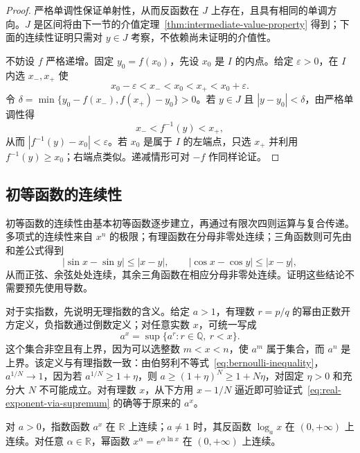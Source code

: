 \begin{proof}
严格单调性保证单射性，从而反函数在 $J$ 上存在，且具有相同的单调方向。$J$ 是区间将由下一节的介值定理~\ref{thm:intermediate-value-property} 得到；下面的连续性证明只需对 $y\in J$ 考察，不依赖尚未证明的介值性。

不妨设 $f$ 严格递增。固定 $y_0=f(x_0)$，先设 $x_0$ 是 $I$ 的内点。给定 $\varepsilon>0$，在 $I$ 内选 $x_-,x_+$ 使
\[
    x_0-\varepsilon<x_-<x_0<x_+<x_0+\varepsilon.
\]
令 $\delta=\min\{y_0-f(x_-),f(x_+)-y_0\}>0$。若 $y\in J$ 且 $|y-y_0|<\delta$，由严格单调性得
\[
    x_-<f^{-1}(y)<x_+,
\]
从而 $|f^{-1}(y)-x_0|<\varepsilon$。若 $x_0$ 是属于 $I$ 的左端点，只选 $x_+$ 并利用 $f^{-1}(y)\geq x_0$；右端点类似。递减情形可对 $-f$ 作同样论证。
\end{proof}

\subsection{初等函数的连续性}
\label{subsec:continuity-of-elementary-functions}

初等函数的连续性由基本初等函数逐步建立，再通过有限次四则运算与复合传递。多项式的连续性来自 $x^n$ 的极限；有理函数在分母非零处连续；三角函数则可先由和差公式得到
\[
    |\sin x-\sin y|\leq|x-y|,
    \qquad |\cos x-\cos y|\leq|x-y|,
\]
从而正弦、余弦处处连续，其余三角函数在相应分母非零处连续。证明这些结论不需要预先使用导数。

对于实指数，先说明无理指数的含义。给定 $a>1$，有理数 $r=p/q$ 的幂由正数开方定义，负指数通过倒数定义；对任意实数 $x$，可统一写成
\begin{equation}
    a^x=\sup\{a^r:r\in\mathbb{Q},\ r<x\}.
    \label{eq:real-exponent-via-supremum}
\end{equation}
这个集合非空且有上界，因为可以选整数 $m<x<n$，使 $a^m$ 属于集合，而 $a^n$ 是上界。该定义与有理指数一致：由伯努利不等式~\eqref{eq:bernoulli-inequality}，$a^{1/N}\to1$，因为若 $a^{1/N}\geq1+\eta$，则 $a\geq(1+\eta)^N\geq1+N\eta$，对固定 $\eta>0$ 和充分大 $N$ 不可能成立。对有理数 $x$，从下方用 $x-1/N$ 逼近即可验证式~\eqref{eq:real-exponent-via-supremum} 的确等于原来的 $a^x$。

\begin{proposition}[指数、对数与幂函数的连续性]
\label{prop:continuity-of-exponential-logarithmic-power-functions}
对 $a>0$，指数函数 $a^x$ 在 $\mathbb{R}$ 上连续；$a\neq1$ 时，其反函数 $\log_a x$ 在 $(0,+\infty)$ 上连续。对任意 $\alpha\in\mathbb{R}$，幂函数 $x^\alpha=e^{\alpha\ln x}$ 在 $(0,+\infty)$ 上连续。
\end{proposition}

